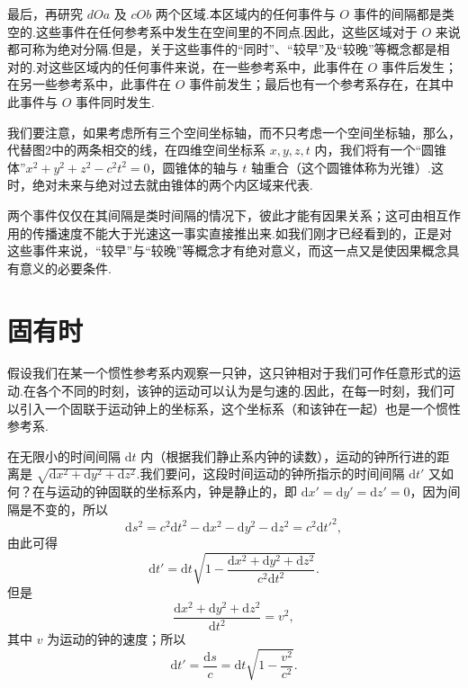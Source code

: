 最后，再研究 $dOa$ 及 $cOb$ 两个区域.本区域内的任何事件与 $O$ 事件的间隔都是类空的.这些事件在任何参考系中发生在空间里的不同点.因此，这些区域对于 $O$ 来说都可称为绝对分隔.但是，关于这些事件的“同时”、“较早”及“较晚”等概念都是相对的.对这些区域内的任何事件来说，在一些参考系中，此事件在 $O$ 事件后发生；在另一些参考系中，此事件在 $O$ 事件前发生；最后也有一个参考系存在，在其中此事件与 $O$ 事件同时发生.

我们要注意，如果考虑所有三个空间坐标轴，而不只考虑一个空间坐标轴，那么，代替图2中的两条相交的线，在四维空间坐标系 $x,y,z,t$ 内，我们将有一个“圆锥体”$x^2+y^2+z^2-c^2t^2=0$，圆锥体的轴与 $t$ 轴重合（这个圆锥体称为光锥）.这时，绝对未来与绝对过去就由锥体的两个内区域来代表.

两个事件仅仅在其间隔是类时间隔的情况下，彼此才能有因果关系；这可由相互作用的传播速度不能大于光速这一事实直接推出来.如我们刚才已经看到的，正是对这些事件来说，“较早”与“较晚”等概念才有绝对意义，而这一点又是使因果概念具有意义的必要条件.

\section{固有时}

假设我们在某一个惯性参考系内观察一只钟，这只钟相对于我们可作任意形式的运动.在各个不同的时刻，该钟的运动可以认为是匀速的.因此，在每一时刻，我们可以引入一个固联于运动钟上的坐标系，这个坐标系（和该钟在一起）也是一个惯性参考系.

在无限小的时间间隔 $\mathrm{d}t$ 内（根据我们静止系内钟的读数），运动的钟所行进的距离是 $\sqrt{\mathrm{d}x^2+\mathrm{d}y^2+\mathrm{d}z^2}$.我们要问，这段时间运动的钟所指示的时间间隔 $\mathrm{d}t'$ 又如何？在与运动的钟固联的坐标系内，钟是静止的，即 $\mathrm{d}x'=\mathrm{d}y'=\mathrm{d}z'=0$，因为间隔是不变的，所以
\begin{equation*}
  \mathrm{d}s^2=c^2\mathrm{d}t^2-\mathrm{d}x^2-\mathrm{d}y^2-\mathrm{d}z^2=c^2\mathrm{d}t'^2,
\end{equation*}
由此可得
\begin{equation*}
  \mathrm{d}t'=\mathrm{d}t\sqrt{1-\frac{\mathrm{d}x^2+\mathrm{d}y^2+\mathrm{d}z^2}{c^2\mathrm{d}t^2}}.
\end{equation*}
但是
\begin{equation*}
  \frac{\mathrm{d}x^2+\mathrm{d}y^2+\mathrm{d}z^2}{\mathrm{d}t^2}=v^2,
\end{equation*}
其中 $v$ 为运动的钟的速度；所以
\begin{equation}
  \mathrm{d}t'=\frac{\mathrm{d}s}{c}=\mathrm{d}t\sqrt{1-\frac{v^2}{c^2}}.
\end{equation}

